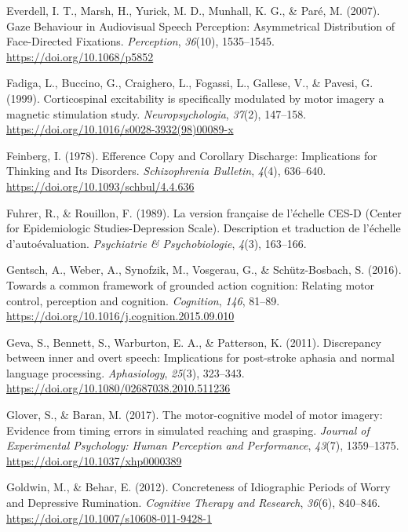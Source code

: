 \documentclass[a4paper,12pt,twoside,openright,oldfontcommands]{memoir}
\begin{document}
\hypertarget{ref-everdell_gaze_2007}{}
Everdell, I. T., Marsh, H., Yurick, M. D., Munhall, K. G., \& Paré, M.
(2007). Gaze Behaviour in Audiovisual Speech Perception: Asymmetrical
Distribution of Face-Directed Fixations. \emph{Perception},
\emph{36}(10), 1535--1545. \url{https://doi.org/10.1068/p5852}

\hypertarget{ref-fadiga_corticospinal_1999}{}
Fadiga, L., Buccino, G., Craighero, L., Fogassi, L., Gallese, V., \&
Pavesi, G. (1999). Corticospinal excitability is specifically modulated
by motor imagery a magnetic stimulation study. \emph{Neuropsychologia},
\emph{37}(2), 147--158.
\url{https://doi.org/10.1016/s0028-3932(98)00089-x}

\hypertarget{ref-feinberg_efference_1978}{}
Feinberg, I. (1978). Efference Copy and Corollary Discharge:
Implications for Thinking and Its Disorders. \emph{Schizophrenia
Bulletin}, \emph{4}(4), 636--640.
\url{https://doi.org/10.1093/schbul/4.4.636}

\hypertarget{ref-fuhrer_version_1989}{}
Fuhrer, R., \& Rouillon, F. (1989). La version française de l'échelle
CES-D (Center for Epidemiologic Studies-Depression Scale). Description
et traduction de l'échelle d'autoévaluation. \emph{Psychiatrie \&
Psychobiologie}, \emph{4}(3), 163--166.

\hypertarget{ref-gentsch_towards_2016}{}
Gentsch, A., Weber, A., Synofzik, M., Vosgerau, G., \& Schütz-Bosbach,
S. (2016). Towards a common framework of grounded action cognition:
Relating motor control, perception and cognition. \emph{Cognition},
\emph{146}, 81--89.
\url{https://doi.org/10.1016/j.cognition.2015.09.010}

\hypertarget{ref-geva_discrepancy_2011}{}
Geva, S., Bennett, S., Warburton, E. A., \& Patterson, K. (2011).
Discrepancy between inner and overt speech: Implications for post-stroke
aphasia and normal language processing. \emph{Aphasiology},
\emph{25}(3), 323--343.
\url{https://doi.org/10.1080/02687038.2010.511236}

\hypertarget{ref-glover_motor-cognitive_2017}{}
Glover, S., \& Baran, M. (2017). The motor-cognitive model of motor
imagery: Evidence from timing errors in simulated reaching and grasping.
\emph{Journal of Experimental Psychology: Human Perception and
Performance}, \emph{43}(7), 1359--1375.
\url{https://doi.org/10.1037/xhp0000389}

\hypertarget{ref-goldwin_concreteness_2012}{}
Goldwin, M., \& Behar, E. (2012). Concreteness of Idiographic Periods of
Worry and Depressive Rumination. \emph{Cognitive Therapy and Research},
\emph{36}(6), 840--846. \url{https://doi.org/10.1007/s10608-011-9428-1}
\end{document}
